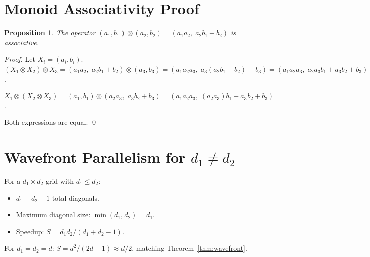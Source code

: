 \documentclass[10pt,twocolumn]{article}
\newtheorem{proposition}{Proposition}
\begin{document}
\appendix

\section{Monoid Associativity Proof}
\label{app:monoid}

\begin{proposition}
The operator $(a_1,b_1) \otimes (a_2,b_2) = (a_1 a_2,\; a_2 b_1 + b_2)$
is associative.
\end{proposition}

\begin{proof}
Let $X_i = (a_i, b_i)$.
$(X_1 \otimes X_2) \otimes X_3
= (a_1 a_2,\; a_2 b_1 + b_2) \otimes (a_3, b_3)
= (a_1 a_2 a_3,\; a_3(a_2 b_1 + b_2) + b_3)
= (a_1 a_2 a_3,\; a_2 a_3 b_1 + a_3 b_2 + b_3)$.

$X_1 \otimes (X_2 \otimes X_3)
= (a_1, b_1) \otimes (a_2 a_3,\; a_3 b_2 + b_3)
= (a_1 a_2 a_3,\; (a_2 a_3) b_1 + a_3 b_2 + b_3)$.

Both expressions are equal. \qed
\end{proof}

\section{Wavefront Parallelism for $d_1 \neq d_2$}
\label{app:wavefront_rect}

For a $d_1 \times d_2$ grid with $d_1 \leq d_2$:
\begin{itemize}
  \item $d_1 + d_2 - 1$ total diagonals.
  \item Maximum diagonal size: $\min(d_1, d_2) = d_1$.
  \item Speedup: $S = d_1 d_2 / (d_1 + d_2 - 1)$.
\end{itemize}
For $d_1 = d_2 = d$: $S = d^2/(2d-1) \approx d/2$, matching Theorem~\ref{thm:wavefront}.
\end{document}
